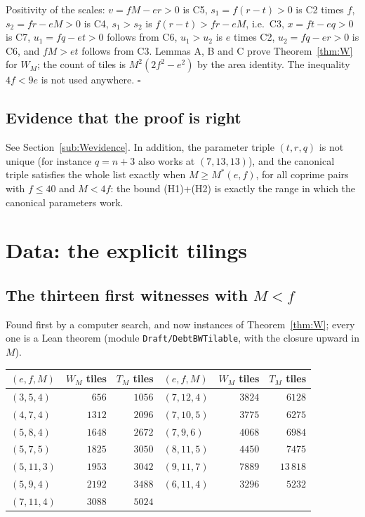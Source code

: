 \documentclass[11pt,reqno]{amsart}
\theoremstyle{plain}
\theoremstyle{definition}
\begin{document}
Positivity of the scales: $v=fM-er>0$ is C5, $s_1=f(r-t)>0$ is C2 times $f$, $s_2=fr-eM>0$ is C4, $s_1>s_2$ is $f(r-t)>fr-eM$, i.e.\ C3, $x=ft-eq>0$ is C7, $u_1=fq-et>0$ follows from C6, $u_1>u_2$ is $e$ times C2, $u_2=fq-er>0$ is C6, and $fM>et$ follows from C3.
Lemmas A, B and C prove Theorem~\ref{thm:W} for $W_M$; the count of tiles is $M^2(2f^2-e^2)$ by the area identity. The inequality $4f<9e$ is not used anywhere. $\square$

\subsection{Evidence that the proof is right}
See Section~\ref{sub:Wevidence}. In addition, the parameter triple $(t,r,q)$ is not unique (for instance $q=n+3$ also works at $(7,13,13)$), and the canonical triple satisfies the whole list exactly when $M\ge M^*(e,f)$, for all coprime pairs with $f\le40$ and $M<4f$: the bound (H1)+(H2) is exactly the range in which the canonical parameters work.

\section{Data: the explicit tilings}\label{app:data}
\subsection{The thirteen first witnesses with $M<f$}
Found first by a computer search, and now instances of Theorem~\ref{thm:W}; every one is a Lean theorem (module \texttt{Draft/DebtBWTilable}, with the closure upward in $M$).
\begin{center}\small
\begin{tabular}{@{}lrr@{\qquad}lrr@{}}
\toprule
$(e,f,M)$ & $W_M$ tiles & $T_M$ tiles & $(e,f,M)$ & $W_M$ tiles & $T_M$ tiles\\
\midrule
$(3,5,4)$ & $656$ & $1056$ & $(7,12,4)$ & $3824$ & $6128$\\
$(4,7,4)$ & $1312$ & $2096$ & $(7,10,5)$ & $3775$ & $6275$\\
$(5,8,4)$ & $1648$ & $2672$ & $(7,9,6)$ & $4068$ & $6984$\\
$(5,7,5)$ & $1825$ & $3050$ & $(8,11,5)$ & $4450$ & $7475$\\
$(5,11,3)$ & $1953$ & $3042$ & $(9,11,7)$ & $7889$ & $13\,818$\\
$(5,9,4)$ & $2192$ & $3488$ & $(6,11,4)$ & $3296$ & $5232$\\
$(7,11,4)$ & $3088$ & $5024$ & & &\\
\bottomrule
\end{tabular}
\end{center}
\end{document}
